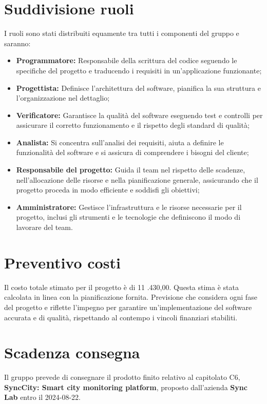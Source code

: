 \section{Suddivisione ruoli}
I ruoli sono stati distribuiti equamente tra tutti i componenti del gruppo e saranno:
\begin{itemize}
	\item \textbf{Programmatore:} Responsabile della scrittura del codice seguendo le specifiche del progetto e traducendo i requisiti in un'applicazione funzionante;
	\item \textbf{Progettista:} Definisce l'architettura del software, pianifica la sua struttura e l'organizzazione nel dettaglio;
	\item \textbf{Verificatore:} Garantisce la qualità del software eseguendo test e controlli per assicurare il corretto funzionamento e il rispetto degli standard di qualità;
	\item \textbf{Analista:} Si concentra sull'analisi dei requisiti, aiuta a definire le funzionalità del software e si assicura di comprendere i bisogni del cliente;
	\item \textbf{Responsabile del progetto:} Guida il team nel rispetto delle scadenze, nell'allocazione delle risorse e nella pianificazione generale, assicurando che il progetto proceda in modo efficiente e soddisfi gli obiettivi;
	\item \textbf{Amministratore:} Gestisce l'infrastruttura e le risorse necessarie per il progetto, inclusi gli strumenti e le tecnologie che definiscono il modo di lavorare del team.
\end{itemize}
\newpage
\section{Preventivo costi}
Il costo totale stimato per il progetto è di 11 .430,00\;\texteuro. Questa stima è stata calcolata in linea con la pianificazione fornita. Previsione che considera ogni fase del progetto e riflette l'impegno per garantire un'implementazione del software accurata e di qualità, rispettando al contempo i vincoli finanziari stabiliti. 
\section{Scadenza consegna}
Il gruppo prevede di consegnare il prodotto finito relativo al capitolato C6, \textbf{SyncCity: Smart city monitoring platform}, proposto dall'azienda \textbf{Sync Lab} entro il 2024-08-22.